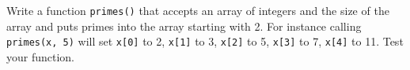  Write a function \texttt{primes()} that accepts an array of integers and the size of the array and puts primes into the array starting with 2. For instance calling \texttt{primes(x, 5)} will set \texttt{x[0]} to 2, \texttt{x[1]} to 3, \texttt{x[2]} to 5, \texttt{x[3]} to 7, \texttt{x[4]} to 11. Test your function.


